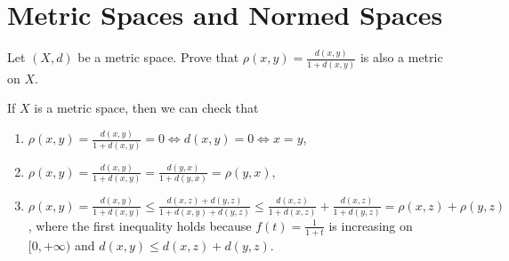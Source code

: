 \documentclass[12pt,letterpaper,boxed]{hmcpset}
\begin{document}
		

\section{Metric Spaces and Normed Spaces}
\begin{problem}[1.1]
	Let $(X,d)$ be a metric space. Prove that $\rho(x,y)=\frac{d(x,y)}{1+d(x,y)}$ is also a metric on $X$.
\end{problem}
\begin{solution}
	If $X$ is a metric space, then we can check that
	\begin{enumerate}
		\item $\rho(x,y)=\frac{d(x,y)}{1+d(x,y)}=0\iff d(x,y)=0\iff x=y$,
		\item $\rho(x,y)=\frac{d(x,y)}{1+d(x,y)}=\frac{d(y,x)}{1+d(y,x)}=\rho(y,x)$,
		\item $\rho(x,y)=\frac{d(x,y)}{1+d(x,y)}\le\frac{d(x,z)+d(y,z)}{1+d(x,y)+d(y,z)}\le \frac{d(x,z)}{1+d(x,z)}+\frac{d(x,z)}{1+d(y,z)}=\rho(x,z)+\rho(y,z)$, where the first inequality holds because $f(t)=\frac{1}{1+t}$ is increasing on $[0,+\infty)$ and $d(x,y)\le d(x,z)+d(y,z)$.
	\end{enumerate}

\end{solution}
\end{document}
